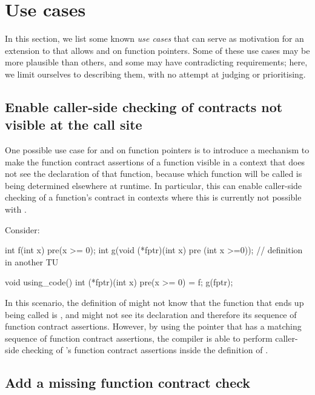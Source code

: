 \section{Use cases}
\label{usecases}

In this section, we list some known \emph{use cases} that can serve as motivation for an extension to \cite{P2900R9} that allows  and  on function pointers. Some of these use cases may be more plausible than others, and some may have contradicting requirements; here, we limit ourselves to describing them, with no attempt at judging or prioritising.

\subsection{Enable caller-side checking of contracts not visible at the call site}
\label{usecase_ville}

One possible use case for  and  on function pointers is to introduce a mechanism to make the function contract assertions of a function visible in a context that does not see the declaration of that function, because which function will be called is being determined elsewhere at runtime. In particular, this can enable caller-side checking of a function's contract in contexts where this is currently not possible with \cite{P2900R9}.

Consider:
\begin{codeblock}
int f(int x) pre(x >= 0);
int g(void (*fptr)(int x) pre (int x >=0)); // definition in another TU

void using_code() {
  int (*fptr)(int x) pre(x >= 0) = f;
  g(fptr);
}
\end{codeblock}
In this scenario, the definition of  might not know that the function that ends up being called is , and might not see its declaration and therefore its sequence of function contract assertions. However, by using the pointer  that has a matching sequence of function contract assertions, the compiler is able to perform caller-side checking of 's function contract assertions inside the definition of .


\subsection{Add a missing function contract check}
\label{usecase_addmissing}

